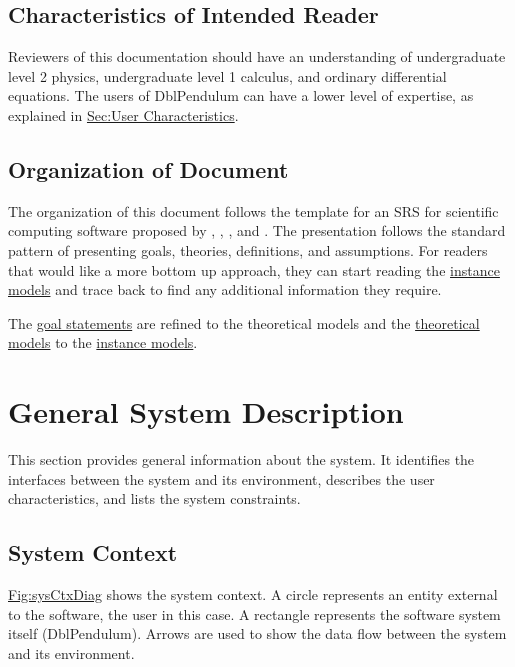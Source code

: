\documentclass[12pt]{article}
\begin{document}
\subsection{Characteristics of Intended Reader}
\label{Sec:ReaderChars}
Reviewers of this documentation should have an understanding of undergraduate level 2 physics, undergraduate level 1 calculus, and ordinary differential equations. The users of DblPendulum can have a lower level of expertise, as explained in \hyperref[Sec:UserChars]{Sec:User Characteristics}.

\subsection{Organization of Document}
\label{Sec:DocOrg}
The organization of this document follows the template for an SRS for scientific computing software proposed by \cite{koothoor2013}, \cite{smithLai2005}, \cite{smithEtAl2007}, and \cite{smithKoothoor2016}. The presentation follows the standard pattern of presenting goals, theories, definitions, and assumptions. For readers that would like a more bottom up approach, they can start reading the \hyperref[Sec:IMs]{instance models} and trace back to find any additional information they require.

The \hyperref[Sec:GoalStmt]{goal statements} are refined to the theoretical models and the \hyperref[Sec:TMs]{theoretical models} to the \hyperref[Sec:IMs]{instance models}.

\section{General System Description}
\label{Sec:GenSysDesc}
This section provides general information about the system. It identifies the interfaces between the system and its environment, describes the user characteristics, and lists the system constraints.

\subsection{System Context}
\label{Sec:SysContext}
\hyperref[Figure:sysCtxDiag]{Fig:sysCtxDiag} shows the system context. A circle represents an entity external to the software, the user in this case. A rectangle represents the software system itself (DblPendulum). Arrows are used to show the data flow between the system and its environment.
\end{document}
